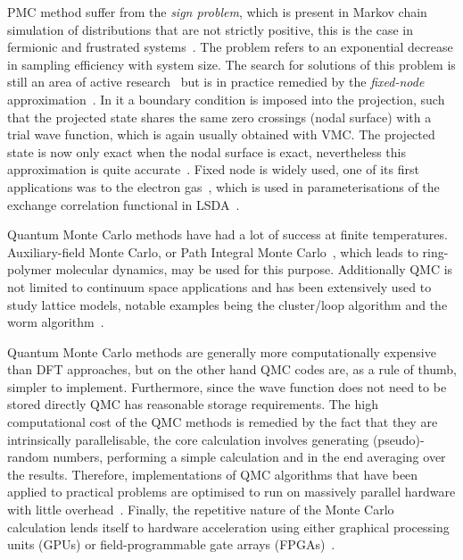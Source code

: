 \documentclass[final,3p,times,twocolumn]{elsarticle}
\begin{document}
		PMC method suffer from the \emph{sign problem}, which is present in Markov chain simulation of distributions that are not strictly positive, this is the case in fermionic and frustrated systems~\cite{gubernatis_kawashima_werner_2016}. The problem refers to an exponential decrease in sampling efficiency with system size. The search for solutions of this problem is still an area of active research~\cite{foulkes2001quantum} but is in practice remedied by the \emph{fixed-node} approximation~\cite{anderson1975random}. In it a boundary condition is imposed into the projection, such that the projected state shares the same zero crossings (nodal surface) with a trial wave function, which is again usually obtained with VMC. The projected state is now only exact when the nodal surface is exact, nevertheless this approximation is quite accurate~\cite{foulkes2001quantum}. Fixed node is widely used, one of its first applications was to the electron gas~\cite{ceperley1980ground}, which is used in parameterisations of the  exchange correlation functional in LSDA~\cite{vosko1980accurate}.
	
		Quantum Monte Carlo methods have had a lot of success at finite temperatures. Auxiliary-field Monte Carlo, or Path Integral Monte Carlo~\cite{ceperley1995path}, which leads to ring-polymer molecular dynamics, may be used for this purpose. Additionally QMC is not limited to continuum space applications and has been extensively used to study lattice models, notable examples being the cluster/loop algorithm and the worm algorithm~\cite{gubernatis_kawashima_werner_2016, prokof1998exact}.
	
		Quantum Monte Carlo methods are generally more computationally expensive than DFT approaches, but on the other hand QMC codes are, as a rule of thumb, simpler to implement. Furthermore, since the wave function does not need to be stored directly QMC has reasonable storage requirements. The high computational cost of the QMC methods is remedied by the fact that they are intrinsically parallelisable, the core calculation involves generating (pseudo)-random numbers, performing a simple calculation and in the end averaging over the results. Therefore, implementations of QMC algorithms that have been applied to practical problems are optimised to run on massively parallel hardware with little overhead~\cite{needs2020variational}. Finally, the repetitive nature of the Monte Carlo calculation lends itself to hardware acceleration using either graphical processing units (GPUs) or field-programmable gate arrays (FPGAs)~\cite{austin2012quantum}.
		
\end{document}

